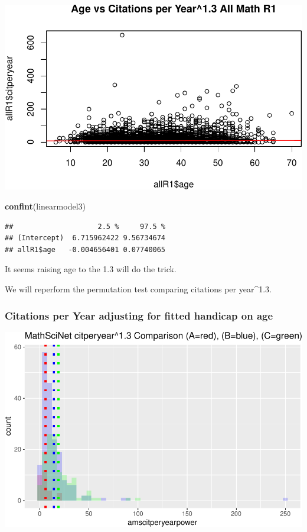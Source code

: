 \documentclass[]{article}
\newenvironment{Shaded}{\begin{snugshade}}{\end{snugshade}}
\newcommand{\KeywordTok}[1]{\textcolor[rgb]{0.13,0.29,0.53}{\textbf{#1}}}
\newcommand{\NormalTok}[1]{#1}
\begin{document}
\includegraphics{Response_files/figure-latex/unnamed-chunk-30-1.pdf}

\begin{Shaded}
\begin{Highlighting}[]
\KeywordTok{confint}\NormalTok{(linearmodel3)}
\end{Highlighting}
\end{Shaded}

\begin{verbatim}
##                    2.5 %     97.5 %
## (Intercept)  6.715962422 9.56734674
## allR1$age   -0.004656401 0.07740065
\end{verbatim}

It seems raising age to the 1.3 will do the trick.

We will reperform the permutation test comparing citations per
year\^{}1.3.

\hypertarget{citations-per-year-adjusting-for-fitted-handicap-on-age}{%
\subsubsection{Citations per Year adjusting for fitted handicap on
age}\label{citations-per-year-adjusting-for-fitted-handicap-on-age}}

\includegraphics{Response_files/figure-latex/unnamed-chunk-32-1.pdf}
\end{document}

